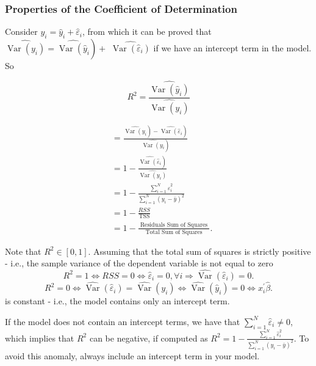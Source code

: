 \subsubsection{Properties of the Coefficient of Determination}
Consider $y_{i}=\widehat{y}_{i}+\widehat{\varepsilon}_{i}$, from which it can be proved that $\left.\widehat{\operatorname{Var}\left(y_{i}\right)}=\widehat{\operatorname{Var}\left(\widehat{y}_{i}\right.}\right)+$ $\widehat{\operatorname{Var}\left(\widehat{\varepsilon}_{i}\right)}$ if we have an intercept term in the model. So

$$
R^{2}=\frac{\widehat{\operatorname{Var}\left(\widehat{y}_{i}\right)}}{\widehat{\operatorname{Var}\left(y_{i}\right)}}
$$

$$
\begin{aligned}
& =\frac{\left.\left.\widehat{\operatorname{Var}\left(y_{i}\right.}\right)-\widehat{\operatorname{Var}\left(\widehat{\varepsilon}_{i}\right.}\right)}{\left.\widehat{\operatorname{Var}\left(y_{i}\right.}\right)} \\
& =1-\frac{\left.\widehat{\operatorname{Var}\left(\widehat{\varepsilon}_{i}\right.}\right)}{\widehat{\operatorname{Var}\left(y_{i}\right)}} \\
& =1-\frac{\sum_{i=1}^{N} \widehat{\varepsilon}_{i}^{2}}{\sum_{i=1}^{N}\left(y_{i}-\bar{y}\right)^{2}} \\
& =1-\frac{R S S}{\operatorname{TSS}} \\
& =1-\frac{\text { Residuals Sum of Squares }}{\text { Total Sum of Squares }} .
\end{aligned}
$$

Note that $R^{2} \in[0,1]$. Assuming that the total sum of squares is strictly positive - i.e., the sample variance of the dependent variable is not equal to zero $$ R^{2}=1 \Longleftrightarrow RSS=0 \Longleftrightarrow \widehat{\varepsilon}_{i}=0, \forall i \Longrightarrow \widehat{\operatorname{Var}}(\widehat{\varepsilon}_{i})=0. $$ $$ R^{2}=0 \Longleftrightarrow \widehat{\operatorname{Var}}(\widehat{\varepsilon}_{i})=\widehat{\operatorname{Var}}(y_{i}) \Longleftrightarrow \widehat{\operatorname{Var}}(\widehat{y}_{i})=0 \Longleftrightarrow x_{i}^{\prime} \widehat{\beta}. $$ is constant - i.e., the model contains only an intercept term.

If the model does not contain an intercept terms, we have that $\sum_{i=1}^{N} \widehat{\varepsilon}_{i} \neq 0$, which implies that $R^{2}$ can be negative, if computed as $R^{2}=1-\frac{\sum_{i=1}^{N} \hat{\varepsilon}_{i}^{2}}{\sum_{i=1}^{N}\left(y_{i}-\bar{y}\right)^{2}}$. To avoid this anomaly, always include an intercept term in your model.

